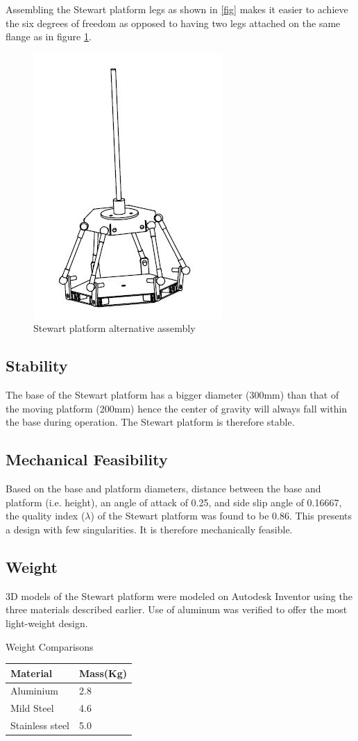 Assembling the Stewart platform legs as shown in \ref{fig} makes it easier to achieve the six degrees of freedom as opposed to having two legs attached on the same flange as in figure \ref{fig2}.
\begin{center}
\begin{figure}[!htb]
\centering
\includegraphics[width=0.3\linewidth]{Figures/assembly2}
\caption[Stewart platform assembly]{Stewart platform alternative assembly}
\label{fig2}
\end{figure}
\end{center}
\subsection{Stability}
The base of the Stewart platform has a bigger diameter (300mm) than that of the moving platform (200mm) hence the center of gravity will always fall within the base during operation. The Stewart platform is therefore stable.
\subsection{Mechanical Feasibility}
Based on the base and platform diameters, distance between the base and platform (i.e. height), an angle of attack of 0.25, and side slip angle of 0.16667, the quality index ($\lambda$) of the Stewart platform was found to be 0.86. This presents a design with few singularities. It is therefore mechanically feasible.
\subsection{Weight}
3D models of the Stewart platform were modeled on Autodesk Inventor using the three materials described earlier. Use of aluminum was verified to offer the most light-weight design.
\begin{table}[!h]
\caption{Weight Comparisons}
\end{table}
\begin{center}
\begin{tabular}{|l|l|}
\hline
\textbf{Material} & \textbf{Mass(Kg)}\\
\hline
Aluminium & 2.8\\
\hline
Mild Steel & 4.6\\
\hline
Stainless steel & 5.0 \\
\hline
\end{tabular}
\end{center}

